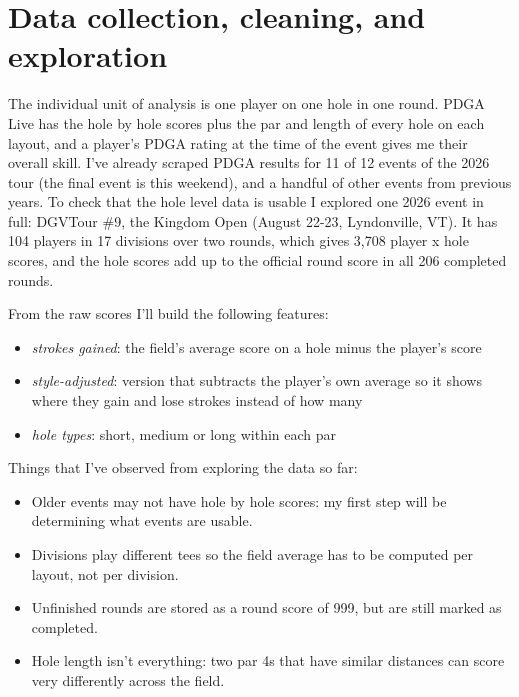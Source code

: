 \documentclass[10pt]{article}
\begin{document}
\section{Data collection, cleaning, and exploration}

The individual unit of analysis is one player on one hole in one round. PDGA Live has the hole by hole scores plus the par and length of every hole on each layout, and a player's PDGA rating at the time of the event gives me their overall skill.
I've already scraped PDGA results for 11 of 12 events of the 2026 tour (the final event is this weekend), and a handful of other events from previous years. To check that the hole level data is usable I explored one 2026 event in full: DGVTour \#9, the Kingdom Open (August 22-23, Lyndonville, VT). It has 104 players in 17 divisions over two rounds, which gives 3,708 player x hole scores, and the hole scores add up to the official round score in all 206 completed rounds.

From the raw scores I'll build the following features:
\begin{itemize}
  \item \emph{strokes gained}: the field's average score on a hole minus the player's score
  \item \emph{style-adjusted}: version that subtracts the player's own average so it shows where they gain and lose strokes instead of how many
  \item \emph{hole types}: short, medium or long within each par
\end{itemize}

Things that I've observed from exploring the data so far:
\begin{itemize}
  \item Older events may not have hole by hole scores: my first step will be determining what events are usable.
  \item Divisions play different tees so the field average has to be computed per layout, not per division.
  \item Unfinished rounds are stored as a round score of 999, but are still marked as completed.
  \item Hole length isn't everything: two par 4s that have similar distances can score very differently across the field.
\end{itemize}

\end{document}

